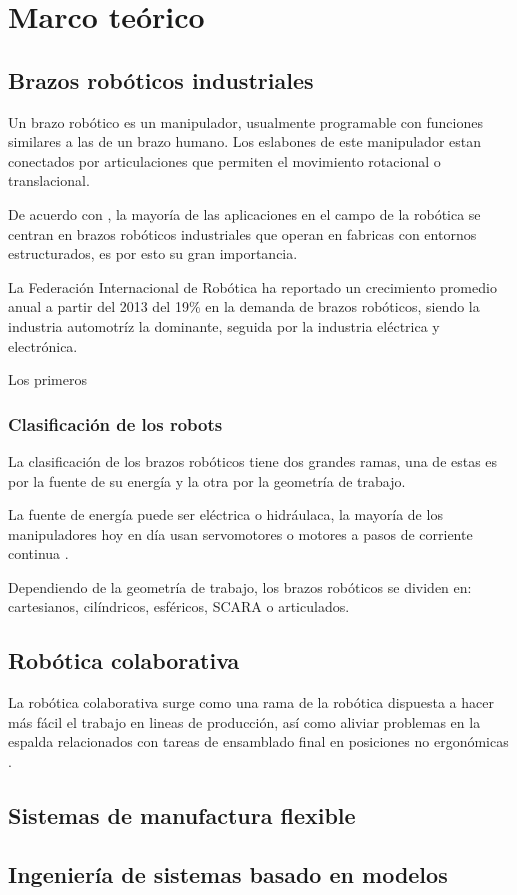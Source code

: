 \chapter{Marco teórico}

\section{Brazos robóticos industriales}

Un brazo robótico es un manipulador, usualmente programable con funciones similares a las de un brazo humano. Los eslabones de este manipulador estan conectados por articulaciones que permiten el movimiento rotacional o translacional. \cite{ReviewRoboticArm} \cite{Schilling2001}

De acuerdo con \cite{Spong2005}, la mayoría de las aplicaciones en el campo de la robótica se centran en brazos robóticos industriales que operan en fabricas con entornos estructurados, es por esto su gran importancia.

La Federación Internacional de Robótica ha reportado un crecimiento promedio anual a partir del 2013 del 19\% en la demanda de brazos robóticos, siendo la industria automotríz la dominante, seguida por la industria eléctrica y electrónica. \cite{summary2019}

Los primeros 

\subsection{Clasificación de los robots}

La clasificación de los brazos robóticos tiene dos grandes ramas, una de estas es por la fuente de su energía y la otra por la geometría de trabajo. 

La fuente de energía puede ser eléctrica o hidráulaca, la mayoría de los manipuladores hoy en día usan servomotores o motores a pasos de corriente continua \cite{Schilling2001}.

Dependiendo de la geometría de trabajo, los brazos robóticos  se dividen en: cartesianos, cilíndricos, esféricos, SCARA o articulados.

\section{Robótica colaborativa}

La robótica colaborativa surge como una rama de la robótica dispuesta a hacer más fácil el trabajo en lineas de producción, así como aliviar problemas en la espalda relacionados con tareas de ensamblado final en posiciones no ergonómicas \cite{cobot2018}\cite{cobotreview}.



\section{Sistemas de manufactura flexible}
\section{Ingeniería de sistemas basado en modelos}
